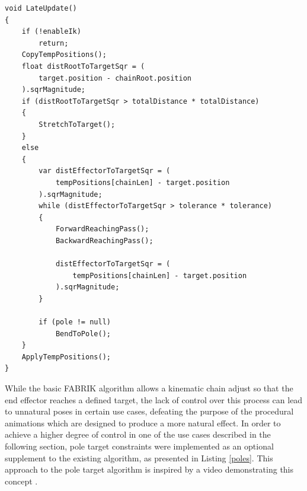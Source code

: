 \begin{lstlisting}[basicstyle=\linespread{0.9}\footnotesize\ttfamily, numbers=none,frame=single,
caption={Full execution of the FABRIK algorithm in each frame.
\textit{Fabrik.cs}},captionpos=t, label=full_loop, language={[Sharp]c}, float=tp]
void LateUpdate()
{
    if (!enableIk)
        return;
    CopyTempPositions();
    float distRootToTargetSqr = (
        target.position - chainRoot.position
    ).sqrMagnitude;
    if (distRootToTargetSqr > totalDistance * totalDistance)
    {
        StretchToTarget();
    }
    else
    {
        var distEffectorToTargetSqr = (
            tempPositions[chainLen] - target.position
        ).sqrMagnitude;
        while (distEffectorToTargetSqr > tolerance * tolerance)
        {
            ForwardReachingPass();
            BackwardReachingPass();

            distEffectorToTargetSqr = (
                tempPositions[chainLen] - target.position
            ).sqrMagnitude;
        }

        if (pole != null)
            BendToPole();
    }
    ApplyTempPositions();
}
\end{lstlisting}

While the basic FABRIK algorithm allows a kinematic chain adjust so that the end
effector reaches a defined target, the lack of control over this process can
lead to unnatural poses in certain use cases, defeating the purpose of the
procedural animations which are designed to produce a more natural effect. In
order to achieve a higher degree of control in one of the use cases described in
the following section, pole target constraints were implemented as an optional
supplement to the existing algorithm, as presented in Listing \ref{poles}. This
approach to the pole target algorithm is inspired by a video demonstrating this
concept \cite{youtube_ik}. 

